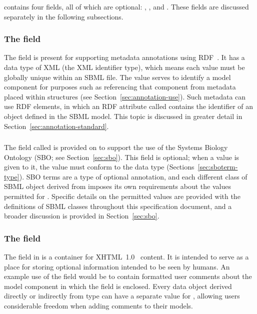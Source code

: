 \SBase contains four fields, all of which are optional:
, ,  and
. These fields are discussed separately in the
following subsections.


\subsubsection{The  field}
\label{sec:metaid}

The  field is present for supporting metadata
annotations using RDF~\citep[Resource Description
Format;][]{lassila:1999}.  It has a data type of XML 
(the XML identifier type), which means each  value
must be globally unique within an SBML file.  The 
value serves to identify a model component for purposes such as
referencing that component from metadata placed within
 structures (see
Section~\ref{sec:annotation-use}).  Such metadata can use RDF
 elements, in which an RDF attribute called
 contains the  identifier of an
object defined in the SBML model.  This topic is discussed in
greater detail in Section~\ref{sec:annotation-standard}.


\subsubsection{}
\label{sec:sbase-sboterm}

The field called  is provided on \SBase to support
the use of the Systems Biology Ontology (SBO; see
Section~\ref{sec:sbo}).  This field is optional; when a value is
given to it, the value must conform to the data type
 (Sections~\ref{sec:sboterm-type}).  SBO terms
are a type of optional annotation, and each different class of
SBML object derived from \SBase imposes its own requirements about
the values permitted for .  Specific details on the
permitted values are provided with the definitions of SBML classes
throughout this specification document, and a broader discussion
is provided in Section~\ref{sec:sbo}.


\subsubsection{The  field}
\label{sec:notes}

The field  in \SBase is a container for
XHTML~1.0~\citep{pemberton:2002} content.  It is intended to serve
as a place for storing optional information intended to be seen by
humans.  An example use of the  field would be to
contain formatted user comments about the model component in which
the  field is enclosed.  Every data object derived
directly or indirectly from type \SBase can have a separate value
for , allowing users considerable freedom when adding
comments to their models.

